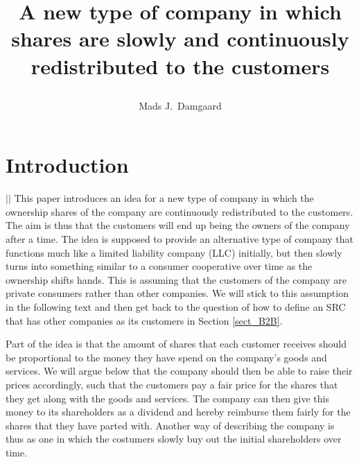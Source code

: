 \documentclass{article}
\title{
	A new type of company in which shares are slowly and continuously redistributed to the customers
	\author{Mads J.\ Damgaard%
	}
}
\begin{document}
\maketitle

\section{Introduction}
{\centering\noindent
	\vspace{-\baselineskip}
	\hspace{-0.7em}
	{\hspace{-4.em}$|$\hspace{\linewidth}\hspace{8em}$|$}
}
This paper introduces an idea for a new type of company in which the ownership shares of the company are continuously redistributed to the customers. The aim is thus that the customers will end up being the owners of the company after a time. The idea is supposed to provide an alternative type of company that functions much like a limited liability company (LLC) initially, but then slowly turns into something similar to a consumer cooperative over time as the ownership shifts hands. 
%
This is assuming that the customers of the company are private consumers rather than other companies. We will stick to this assumption in the following text and then get back to the question of how to define an SRC that has other companies as its customers in Section \ref{sect_B2B}. 

Part of the idea is that the amount of shares that each customer receives should be proportional to the money they have spend on the company's goods and services. We will argue below that the company should then be able to raise their prices accordingly, such that the customers pay a fair price for the shares that they get along with the goods and services. The company can then give this money to its shareholders as a dividend and hereby reimburse them fairly for the shares that they have parted with. 
%
Another way of describing the company is thus as one in which the costumers slowly buy out the initial shareholders over time.
\end{document}
